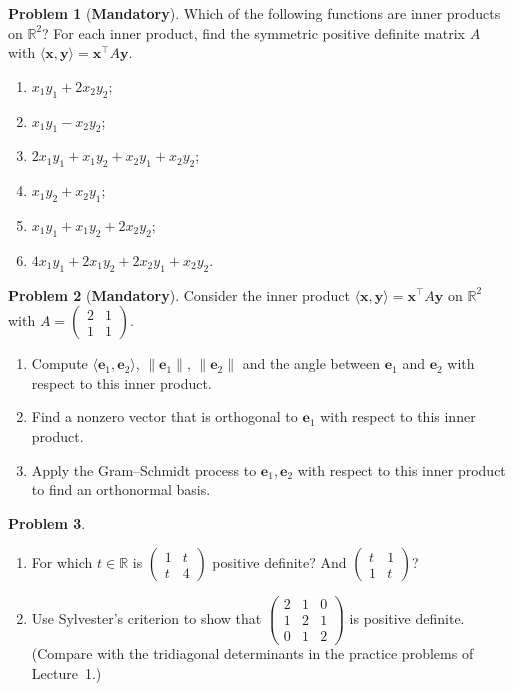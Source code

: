 \documentclass[11pt]{article}
\theoremstyle{definition}
\newtheorem{problem}{Problem}[section]
\newcommand{\mandatory}{\textcolor{red!70!black}{\textbf{Mandatory}}}
\newcommand{\norm}[1]{\lVert #1 \rVert}
\newcommand{\ip}[2]{\langle #1, #2 \rangle}
\begin{document}
\begin{problem}[\mandatory]\label{pr:which-ip}
    Which of the following functions are inner products on $\mathbb{R}^2$? For each inner product, find the symmetric positive definite matrix $A$ with $\ip{\mathbf{x}}{\mathbf{y}} = \mathbf{x}^\top A \mathbf{y}$.
    \begin{enumerate}[label=(\alph*)]
        \item $x_1 y_1 + 2 x_2 y_2$;
        \item $x_1 y_1 - x_2 y_2$;
        \item $2x_1 y_1 + x_1 y_2 + x_2 y_1 + x_2 y_2$;
        \item $x_1 y_2 + x_2 y_1$;
        \item $x_1 y_1 + x_1 y_2 + 2x_2 y_2$;
        \item $4x_1 y_1 + 2x_1 y_2 + 2x_2 y_1 + x_2 y_2$.
    \end{enumerate}
\end{problem}

\begin{problem}[\mandatory]\label{pr:ip-gram}
    Consider the inner product $\ip{\mathbf{x}}{\mathbf{y}} = \mathbf{x}^\top A \mathbf{y}$ on $\mathbb{R}^2$ with $A = \begin{pmatrix} 2 & 1 \\ 1 & 1 \end{pmatrix}$.
    \begin{enumerate}[label=(\alph*)]
        \item Compute $\ip{\mathbf{e}_1}{\mathbf{e}_2}$, $\norm{\mathbf{e}_1}$, $\norm{\mathbf{e}_2}$ and the angle between $\mathbf{e}_1$ and $\mathbf{e}_2$ with respect to this inner product.
        \item Find a nonzero vector that is orthogonal to $\mathbf{e}_1$ with respect to this inner product.
        \item Apply the Gram--Schmidt process to $\mathbf{e}_1, \mathbf{e}_2$ with respect to this inner product to find an orthonormal basis.
    \end{enumerate}
\end{problem}

\begin{problem}\label{pr:spd-param}
    \begin{enumerate}[label=(\alph*)]
        \item For which $t \in \mathbb{R}$ is $\begin{pmatrix} 1 & t \\ t & 4 \end{pmatrix}$ positive definite? And $\begin{pmatrix} t & 1 \\ 1 & t \end{pmatrix}$?
        \item Use Sylvester's criterion to show that $\begin{pmatrix} 2 & 1 & 0 \\ 1 & 2 & 1 \\ 0 & 1 & 2 \end{pmatrix}$ is positive definite. (Compare with the tridiagonal determinants in the practice problems of Lecture~1.)
    \end{enumerate}
\end{problem}
\end{document}
